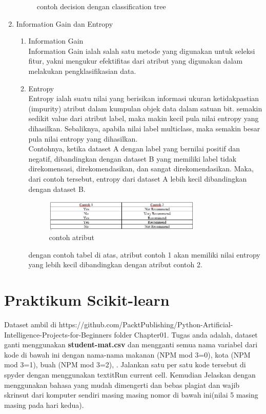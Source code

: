 \begin{enumerate}
\begin{figure}[H]
    \caption{contoh decision dengan classification tree}
    \label{fig:my_label}
\end{figure}
\item Information Gain dan Entropy\\
\begin{enumerate}
    \item Information Gain\\
    Information Gain ialah salah satu metode yang digunakan untuk seleksi fitur, yakni mengukur efektifitas dari atribut yang digunakan dalam melakukan pengklasifikasian data.
    \item Entropy\\
    Entropy ialah suatu nilai yang berisikan informasi ukuran ketidakpastian (impurity) atribut dalam kumpulan objek data dalam satuan bit. semakin sedikit value dari atribut label, maka makin kecil pula nilai entropy yang dihasilkan. Sebaliknya, apabila nilai label multiclass, maka semakin besar pula nilai entropy yang dihasilkan.\\
    Contohnya, ketika dataset A dengan label yang bernilai positif dan negatif, dibandingkan dengan dataset B yang memiliki label tidak direkomensasi, direkomendasikan, dan sangat direkomendasikan. Maka, dari contoh tersebut, entropy dari dataset A lebih kecil dibandingkan dengan dataset B.
\begin{figure}[H]
    \centering
    \includegraphics[width=0.75\textwidth]{figures/example.png}
    \caption{contoh atribut}
    \label{fig:my_label}
\end{figure}
dengan contoh tabel di atas, atribut contoh 1 akan memiliki nilai entropy yang lebih kecil dibandingkan dengan atribut contoh 2.
\end{enumerate}
\end{enumerate}

\section{ Praktikum Scikit-learn}
Dataset ambil di https://github.com/PacktPublishing/Python-Artificial-Intelligence-Projects-for-Beginners folder Chapter01.
Tugas anda adalah, dataset ganti menggunakan \textbf{student-mat.csv} dan mengganti semua nama variabel dari kode di bawah ini dengan nama-nama makanan (NPM mod 3=0), kota (NPM mod 3=1), buah (NPM mod 3=2), . Jalankan satu per satu kode tersebut di spyder dengan menggunakan textit{Run current cell}. Kemudian Jelaskan dengan menggunakan bahasa yang mudah dimengerti dan bebas plagiat dan wajib skrinsut dari komputer sendiri masing masing nomor di bawah ini(nilai 5 masing masing pada hari kedua).

